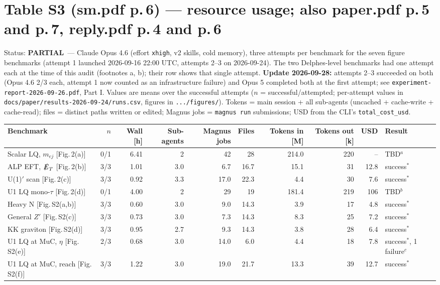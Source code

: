 \documentclass[11pt]{article}
\newcommand{\statuspartial}{\textcolor{orange!80!black}{\textbf{PARTIAL}}}
\begin{document}
\section{Table S3 (sm.pdf p.\,6) --- resource usage; also paper.pdf p.\,5 and p.\,7, reply.pdf p.\,4 and p.\,6}
Status: \statuspartial\ --- Claude Opus 4.6 (effort \texttt{xhigh}, v2 skills, cold memory), three attempts per benchmark
for the seven figure benchmarks (attempt 1 launched 2026-09-16 22:00 UTC, attempts 2--3 on 2026-09-24). The two
Delphes-level benchmarks had one attempt each at the time of this audit (footnotes a, b); their row shows that single attempt. \textbf{Update 2026-09-28:} attempts 2--3 succeeded on both (Opus 4.6 2/3 each, attempt 1 now counted as an infrastructure failure) and Opus 5 completed both at the first attempt; see \texttt{experiment-report-2026-09-26.pdf}, Part I.
Values are means over the successful attempts ($n$ = successful/attempted; per-attempt values in
\texttt{docs/paper/results-2026-09-24/runs.csv}, figures in \texttt{.../figures/}).
Tokens = main session + all sub-agents (uncached + cache-write + cache-read); files = distinct paths written or edited;
Magnus jobs = \texttt{magnus run} submissions; USD from the CLI's \texttt{total\_cost\_usd}.

\begin{center}\scriptsize\setlength{\tabcolsep}{3pt}
\begin{tabular}{lrrrrrrrrl}
\toprule
Benchmark & $n$ & Wall [h] & Sub-agents & Magnus jobs & Files & Tokens in [M] & Tokens out [k] & USD & Result \\
\midrule
Scalar LQ, $m_{ej}$ [Fig.\,2(a)] & 0/1 & 6.41 & 2 & 42 & 28 & 214.0 & 220 & -- & TBD$^{a}$ \\
ALP EFT, $\slashed{E}_T$ [Fig.\,2(b)] & 3/3 & 1.01 & 3.0 & 6.7 & 16.7 & 15.1 & 31 & 12.8 & success$^{*}$ \\
U(1)$'$ scan [Fig.\,2(c)] & 3/3 & 0.92 & 3.3 & 17.0 & 22.3 & 4.4 & 30 & 7.6 & success$^{*}$ \\
U1 LQ mono-$\tau$ [Fig.\,2(d)] & 0/1 & 4.00 & 2 & 29 & 19 & 181.4 & 219 & 106 & TBD$^{b}$ \\
Heavy N [Fig.\,S2(a,b)] & 3/3 & 0.60 & 3.0 & 9.0 & 14.3 & 3.9 & 17 & 4.8 & success$^{*}$ \\
General $Z'$ [Fig.\,S2(c)] & 3/3 & 0.73 & 3.0 & 7.3 & 14.3 & 8.3 & 25 & 7.2 & success$^{*}$ \\
KK graviton [Fig.\,S2(d)] & 3/3 & 0.95 & 2.7 & 9.3 & 14.3 & 3.8 & 28 & 6.4 & success$^{*}$ \\
U1 LQ at MuC, $\eta$ [Fig.\,S2(e)] & 2/3 & 0.68 & 3.0 & 14.0 & 6.0 & 4.4 & 18 & 7.8 & success$^{*}$, 1 failure$^{c}$ \\
U1 LQ at MuC, reach [Fig.\,S2(f)] & 3/3 & 1.22 & 3.0 & 19.0 & 21.7 & 13.3 & 39 & 12.7 & success$^{*}$ \\
\bottomrule
\end{tabular}
\end{center}
\end{document}
